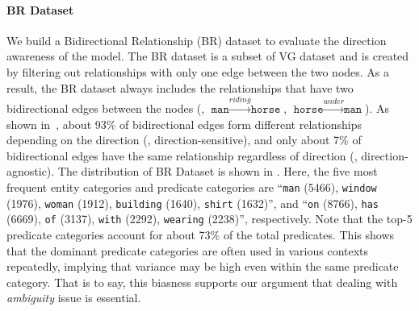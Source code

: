         \paragraph{BR Dataset}
            We build a Bidirectional Relationship (BR) dataset to evaluate the direction awareness of the model.
            The BR dataset is a subset of VG dataset and is created by filtering out relationships with only one edge between the two nodes.
            As a result, the BR dataset always includes the relationships that have two bidirectional edges between the nodes (\eg, $\texttt{man} \xrightarrow{riding} \texttt{horse}$, $\texttt{horse} \xrightarrow{under} \texttt{man}$).
            As shown in~, about 93\% of bidirectional edges form different relationships depending on the direction (\ie, direction-sensitive), and only about 7\% of bidirectional edges have the same relationship regardless of direction (\ie, direction-agnostic).
            The distribution of BR Dataset is shown in . Here, the five most frequent entity categories and predicate categories are ``\texttt{man} (5466), \texttt{window} (1976), \texttt{woman} (1912), \texttt{building} (1640), \texttt{shirt} (1632)'', and ``\texttt{on} (8766), \texttt{has} (6669), \texttt{of} (3137), \texttt{with} (2292), \texttt{wearing} (2238)'', respectively. Note that the top-5 predicate categories account for about 73\% of the total predicates.
            This shows that the dominant predicate categories are often used in various contexts repeatedly, implying that variance may be high even within the same predicate category.
            That is to say, this biasness supports our argument that dealing with \textit{ambiguity} issue is essential.
            
